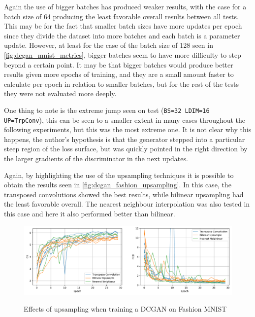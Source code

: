 Again the use of bigger batches has produced weaker results, with the case for a batch size of 64 producing the least favorable overall results between all tests. This may be for the fact that smaller batch sizes have more updates per epoch since they divide the dataset into more batches and each batch is a parameter update. However, at least for the case of the batch size of 128 seen in \autoref{fig:dcgan_mnist_metrics}, bigger batches seem to have more difficulty to step beyond a certain point. It may be that bigger batches would produce better results given more epochs of training, and they are a small amount faster to calculate per epoch in relation to smaller batches, but for the rest of the tests they were not evaluated more deeply.

One thing to note is the extreme jump seen on test (\texttt{BS=32 LDIM=16 UP=TrpConv}), this can be seen to a smaller extent in many cases throughout the following experiments, but this was the most extreme one. It is not clear why this happens, the author's hypothesis is that the generator stepped into a particular steep region of the loss surface, but was quickly pointed in the right direction by the larger gradients of the discriminator in the next updates.

Again, by highlighting the use of the upsampling techniques it is possible to obtain the results seen in \autoref{fig:dcgan_fashion_upsampling}. In this case, the transposed convolutions showed the best results, while bilinear upsampling had the least favorable overall. The nearest neighbour interpolation was also tested in this case and here it also performed better than bilinear.
\begin{figure}[hbt]
    \centering
    \caption{Effects of upsampling when training a DCGAN on Fashion MNIST}
    \includegraphics[width=\textwidth]{chapters/Experiments/DCGAN/fashion_upsampling.pdf}
    \label{fig:dcgan_fashion_upsampling}
\end{figure}

